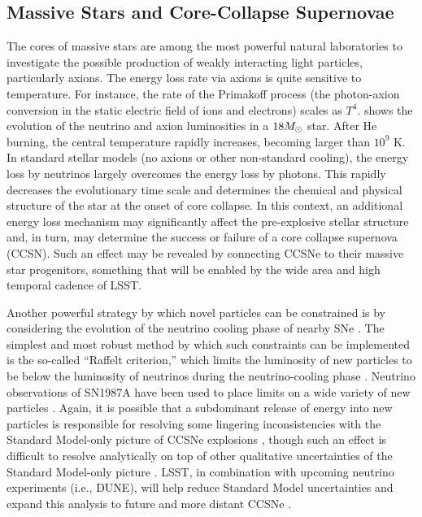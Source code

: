 \subsection{Massive Stars and Core-Collapse Supernovae}

The cores of massive stars are among the most powerful natural laboratories to investigate the possible production of weakly interacting light particles, particularly axions. 
The energy loss rate via axions is quite sensitive to temperature. 
For instance, the rate of the Primakoff process (the photon-axion conversion in the static electric field of ions and electrons) scales as $T^4$. 
 shows the evolution of the neutrino and axion luminosities in a $18M_\odot$ star. 
After He burning, the central temperature rapidly increases, becoming larger than $10^9$ K. 
In standard stellar models (no axions or other non-standard cooling), the energy loss by neutrinos largely overcomes the energy loss by photons. This rapidly decreases the evolutionary time scale and determines the chemical and physical structure of the star at the onset of core collapse. 
In this context, an additional energy loss mechanism may significantly affect the pre-explosive stellar structure and, in turn, may determine the success or failure of a core collapse supernova (CCSN). 
Such an effect may be revealed by connecting CCSNe to their massive star progenitors, something that will be enabled by the wide area and high temporal cadence of LSST.

Another powerful strategy by which novel particles can be constrained is by considering the evolution of the neutrino cooling phase of nearby SNe  \citep[\ie, SN1987A][]{Burrows:1988, Raffelt:1988}.
The simplest and most robust method by which such constraints can be implemented is the so-called ``Raffelt criterion,'' which limits the luminosity of new particles to be below the luminosity of neutrinos during the neutrino-cooling phase \citep{hep-ph/0611350}.
Neutrino observations of SN1987A have been used to place limits on a wide variety of new particles \citep{hep-ph/0207098, 1611.03864, 1611.05852, 1803.00993, 1808.10136}.
Again, it is possible that a subdominant release of energy into new particles is responsible for resolving some lingering inconsistencies with the Standard Model-only picture of CCSNe explosions \citep{0806.4273, 1805.07381}, though such an effect is difficult to resolve analytically on top of other qualitative uncertainties of the Standard Model-only picture \citep{1809.05106, 1811.11178}.
LSST, in combination with upcoming neutrino experiments (i.e., DUNE), will help reduce Standard Model uncertainties and expand this analysis to future and more distant CCSNe \citep{1807.10334}.

